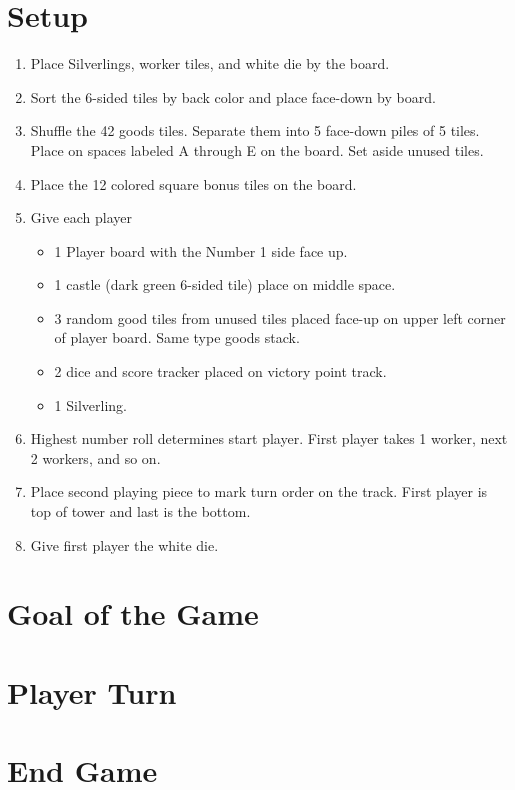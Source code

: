 \documentclass[12pt]{article}
\newenvironment{enumerateCustom}
{\begin{enumerate}
  \setlength{\itemsep}{1pt}
  \setlength{\parskip}{0pt}
  \setlength{\parsep}{0pt}}
{\end{enumerate}}
\newenvironment{itemizeCustom}
{\begin{itemize}
  \setlength{\itemsep}{1pt}
  \setlength{\parskip}{0pt}
  \setlength{\parsep}{0pt}}
{\end{itemize}}
\begin{document}
\begin{mdframed}[style = customFrame]
\begin{multicols*}{2}

\section*{Setup}
\begin{enumerateCustom}
	\item Place Silverlings, worker tiles, and white die by the board.
	\item Sort the 6-sided tiles by back color and place face-down by board.
	\item Shuffle the 42 goods tiles. Separate them into 5 face-down piles of 5 tiles. Place on spaces labeled A through E on the board. Set aside unused tiles.
	\item Place the 12 colored square bonus tiles on the board.
	\item Give each player
		\begin{itemizeCustom}
			\item 1 Player board with the Number 1 side face up.
			\item 1 castle (dark green 6-sided tile) place on middle space.
			\item 3 random good tiles from unused tiles placed face-up on upper left corner of player board. Same type goods stack.
			\item 2 dice and score tracker placed on victory point track.
			\item 1 Silverling.
		\end{itemizeCustom}
	\item Highest number roll determines start player. First player takes 1 worker, next 2 workers, and so on. 
	\item Place second playing piece to mark turn order on the track. First player is top of tower and last is the bottom.
	\item Give first player the white die.
\end{enumerateCustom}
\section*{Goal of the Game}
\section*{Player Turn}
\section*{End Game}

\end{multicols*}
\end{mdframed}
\end{document}
